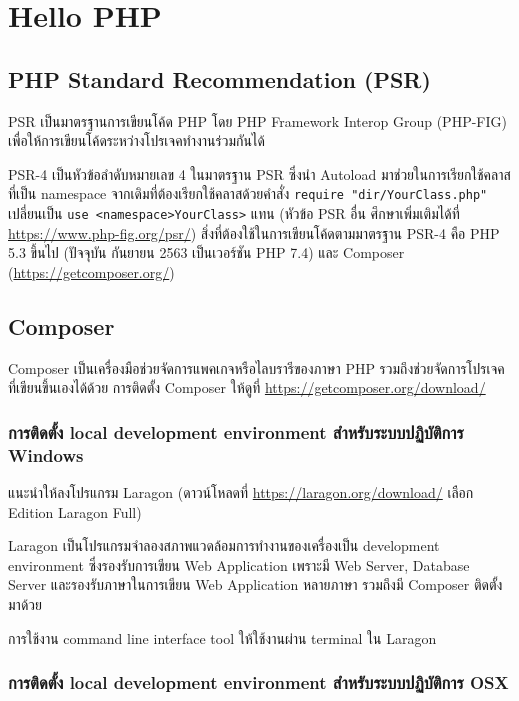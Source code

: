 \chapter{Hello PHP}

\section{PHP Standard Recommendation (PSR)}

PSR เป็นมาตรฐานการเขียนโค้ด PHP โดย PHP Framework Interop Group (PHP-FIG) 
เพื่อให้การเขียนโค้ดระหว่างโปรเจคทำงานร่วมกันได้

PSR-4 เป็นหัวข้อลำดับหมายเลข 4 ในมาตรฐาน PSR ซึ่งนำ Autoload 
มาช่วยในการเรียกใช้คลาสที่เป็น namespace จากเดิมที่ต้องเรียกใช้คลาสด้วยคำสั่ง 
\texttt{require "dir/YourClass.php"} 
เปลี่ยนเป็น \texttt{use <namespace>\<YourClass>} แทน 
(หัวข้อ PSR อื่น ศึกษาเพิ่มเติมได้ที่ \href{https://www.php-fig.org/psr/}{https://www.php-fig.org/psr/}) 
สิ่งที่ต้องใช้ในการเขียนโค้ดตามมาตรฐาน PSR-4 คือ PHP 5.3 ขึ้นไป 
(ปัจจุบัน กันยายน 2563 เป็นเวอร์ชัน PHP 7.4) และ 
Composer (\href{https://getcomposer.org/}{https://getcomposer.org/})

\section{Composer}

Composer เป็นเครื่องมือช่วยจัดการแพคเกจหรือไลบรารีของภาษา PHP 
รวมถึงช่วยจัดการโปรเจคที่เขียนขึ้นเองได้ด้วย การติดตั้ง Composer 
ให้ดูที่ \href{https://getcomposer.org/download/}{https://getcomposer.org/download/} 

\subsection{การติดตั้ง local development environment สำหรับระบบปฏิบัติการ Windows}
แนะนำให้ลงโปรแกรม Laragon 
(ดาวน์โหลดที่ \href{https://laragon.org/download/}{https://laragon.org/download/} 
เลือก Edition Laragon Full)

Laragon เป็นโปรแกรมจำลองสภาพแวดล้อมการทำงานของเครื่องเป็น 
development environment ซึ่งรองรับการเขียน Web Application 
เพราะมี Web Server, Database Server และรองรับภาษาในการเขียน 
Web Application หลายภาษา รวมถึงมี Composer ติดตั้งมาด้วย

การใช้งาน command line interface tool ให้ใช้งานผ่าน terminal ใน Laragon

\subsection{การติดตั้ง local development environment สำหรับระบบปฏิบัติการ OSX}

